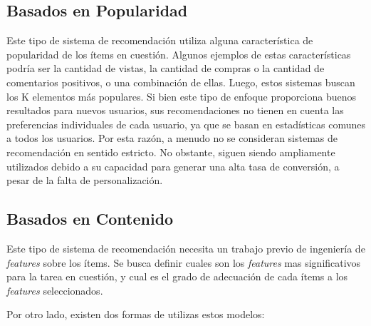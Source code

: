 \documentclass[11pt,a4paper,twoside]{thesis}
\begin{document}
\subsection{Basados en Popularidad}

Este tipo de sistema de recomendación utiliza alguna característica de
popularidad de los ítems en cuestión. Algunos ejemplos de estas características
podría ser la cantidad de vistas, la cantidad de compras o la cantidad de
comentarios positivos, o una combinación de ellas. Luego, estos sistemas buscan
los K elementos más populares. Si bien este tipo de enfoque proporciona buenos
resultados para nuevos usuarios, sus recomendaciones no tienen en cuenta las
preferencias individuales de cada usuario, ya que se basan en estadísticas
comunes a todos los usuarios. Por esta razón, a menudo no se consideran
sistemas de recomendación en sentido estricto. No obstante, siguen siendo
ampliamente utilizados debido a su capacidad para generar una alta tasa de
conversión, a pesar de la falta de personalización.

\subsection{Basados en Contenido}

Este tipo de sistema de recomendación necesita un trabajo previo de ingeniería
de \textit{features} sobre los ítems. Se busca definir cuales son los
\textit{features} mas significativos para la tarea en cuestión, y cual es el
grado de adecuación de cada ítems a los \textit{features} seleccionados.

Por otro lado, existen dos formas de utilizas estos modelos:
\end{document}
